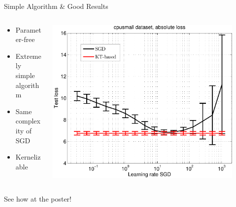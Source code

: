 \documentclass{beamer}
\begin{document}
\begin{frame}{Simple Algorithm \& Good Results}

\begin{columns}[c]
  \begin{column}{5cm}
   \small 
   \begin{itemize}
    \item Parameter-free
    \item Extremely simple algorithm
    \item Same complexity of SGD
    \item Kernelizable
    \end{itemize}
  \end{column}
  \begin{column}{6cm}
    \includegraphics[width=0.9\textwidth]{../figs/cpusmall_kt_train_test-crop}
  \end{column}
\end{columns}

\vspace{.25cm}


\begin{center}
\huge
See how at the poster!
\end{center}

\end{frame}
\end{document}
